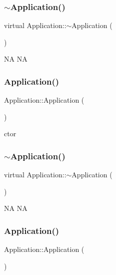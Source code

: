 \subsubsection{\texorpdfstring{$\sim$\+Application()}{~Application()}\hspace{0.1cm}{\footnotesize\ttfamily [8/11]}}
{\footnotesize\ttfamily virtual Application\+::$\sim$\+Application (\begin{DoxyParamCaption}{ }\end{DoxyParamCaption})\hspace{0.3cm}{\ttfamily [virtual]}}

NA  NA \mbox{\label{classApplication_afa8cc05ce6b6092be5ecdfdae44e05f8}} 
\subsubsection{\texorpdfstring{Application()}{Application()}\hspace{0.1cm}{\footnotesize\ttfamily [9/11]}}
{\footnotesize\ttfamily Application\+::\+Application (\begin{DoxyParamCaption}{ }\end{DoxyParamCaption})}

ctor \mbox{\label{classApplication_a20573928a0d53fb96d929513bc5acde6}} 
\subsubsection{\texorpdfstring{$\sim$\+Application()}{~Application()}\hspace{0.1cm}{\footnotesize\ttfamily [9/11]}}
{\footnotesize\ttfamily virtual Application\+::$\sim$\+Application (\begin{DoxyParamCaption}{ }\end{DoxyParamCaption})\hspace{0.3cm}{\ttfamily [virtual]}}

NA  NA \mbox{\label{classApplication_afa8cc05ce6b6092be5ecdfdae44e05f8}} 
\subsubsection{\texorpdfstring{Application()}{Application()}\hspace{0.1cm}{\footnotesize\ttfamily [10/11]}}
{\footnotesize\ttfamily Application\+::\+Application (\begin{DoxyParamCaption}{ }\end{DoxyParamCaption})}

